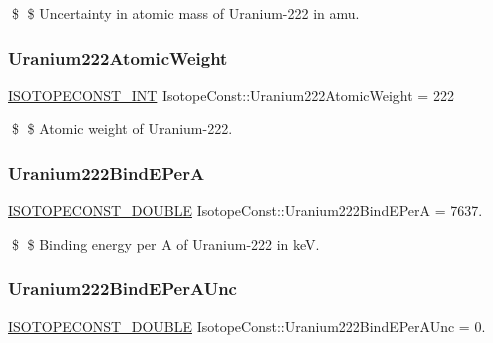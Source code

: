 \$ \$ Uncertainty in atomic mass of Uranium-\/222 in amu. \mbox{\label{group___isotope_const-_uranium-_u222_ga8c89bea275e2805181a21c9d63471adb}} 
\subsubsection{\texorpdfstring{Uranium222\+Atomic\+Weight}{Uranium222AtomicWeight}}
{\footnotesize\ttfamily \mbox{\hyperlink{group___isotope_const-_macros_ga5f18360b3e99483a35c32d789e62621c}{I\+S\+O\+T\+O\+P\+E\+C\+O\+N\+S\+T\+\_\+\+I\+NT}} Isotope\+Const\+::\+Uranium222\+Atomic\+Weight = 222}

\$ \$ Atomic weight of Uranium-\/222. \mbox{\label{group___isotope_const-_uranium-_u222_ga4c5034f4bf41be8f4c7a6764bd20d86e}} 
\subsubsection{\texorpdfstring{Uranium222\+Bind\+E\+PerA}{Uranium222BindEPerA}}
{\footnotesize\ttfamily \mbox{\hyperlink{group___isotope_const-_macros_ga8f45a7272ce02c0b4c65c44636ed719a}{I\+S\+O\+T\+O\+P\+E\+C\+O\+N\+S\+T\+\_\+\+D\+O\+U\+B\+LE}} Isotope\+Const\+::\+Uranium222\+Bind\+E\+PerA = 7637.}

\$ \$ Binding energy per A of Uranium-\/222 in keV. \mbox{\label{group___isotope_const-_uranium-_u222_ga22b1720a0b1baabd212ef322927b189b}} 
\subsubsection{\texorpdfstring{Uranium222\+Bind\+E\+Per\+A\+Unc}{Uranium222BindEPerAUnc}}
{\footnotesize\ttfamily \mbox{\hyperlink{group___isotope_const-_macros_ga8f45a7272ce02c0b4c65c44636ed719a}{I\+S\+O\+T\+O\+P\+E\+C\+O\+N\+S\+T\+\_\+\+D\+O\+U\+B\+LE}} Isotope\+Const\+::\+Uranium222\+Bind\+E\+Per\+A\+Unc = 0.}

